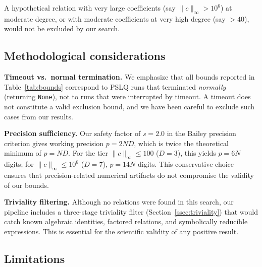 \documentclass[11pt]{amsart}
\theoremstyle{remark}
\newcommand{\norm}[1]{\lVert #1 \rVert}
\begin{document}
A hypothetical relation with very large coefficients (say $\norm{c}_\infty>10^6$) at
moderate degree, or with moderate coefficients at very high degree (say ${}>40$),
would not be excluded by our search.

\subsection{Methodological considerations}\label{ssec:methodology}

\noindent\textbf{Timeout vs.\ normal termination.}
We emphasize that all bounds reported in Table~\ref{tab:bounds} correspond to PSLQ
runs that terminated \emph{normally} (returning \texttt{None}), not to runs that were
interrupted by timeout. A timeout does not constitute a valid exclusion bound, and we
have been careful to exclude such cases from our results.

\medskip\noindent\textbf{Precision sufficiency.}
Our safety factor of $s=2.0$ in the Bailey precision criterion gives working
precision $p=2ND$, which is twice the theoretical minimum of $p=ND$. For the tier
$\norm{c}_\infty\le 100$ ($D=3$), this yields $p=6N$ digits; for
$\norm{c}_\infty\le 10^6$ ($D=7$), $p=14N$ digits. This conservative choice ensures
that precision-related numerical artifacts do not compromise the validity of our
bounds.

\medskip\noindent\textbf{Triviality filtering.}
Although no relations were found in this search, our pipeline includes a three-stage
triviality filter (Section~\ref{ssec:triviality}) that would catch known algebraic
identities, factored relations, and symbolically reducible expressions. This is
essential for the scientific validity of any positive result.

\subsection{Limitations}\label{ssec:limitations}
\end{document}
